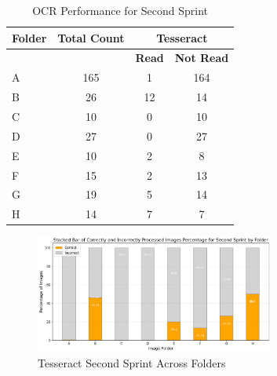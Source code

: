 \begin{table}[h]
    \centering
    \caption{OCR Performance for Second Sprint}
    \label{tab:second_print_results}
    \begin{tabular}{|l|c|c|c|}
        \hline
        \textbf{Folder} & \textbf{Total Count} & \multicolumn{2}{c|}{\textbf{Tesseract}}                     \\
        \hline
                        &                      & \textbf{Read}                           & \textbf{Not Read} \\
        \hline
        A               & 165                  & 1                                       & 164               \\
        B               & 26                   & 12                                      & 14                \\
        C               & 10                   & 0                                       & 10                \\
        D               & 27                   & 0                                       & 27                \\
        E               & 10                   & 2                                       & 8                 \\
        F               & 15                   & 2                                       & 13                \\
        G               & 19                   & 5                                       & 14                \\
        H               & 14                   & 7                                       & 7                 \\
        \hline
    \end{tabular}
\end{table}

\vspace{1in}

\begin{figure}[ht]
    \centering
    \includegraphics[width=0.7\textwidth]{Figures/Results/tesseract_sprints_two.png}
    \caption[Tesseract Second Sprint Across Folders]{Tesseract Second Sprint Across Folders}
    \label{fig:Tesseract Second Sprint Across Folders}
\end{figure}

